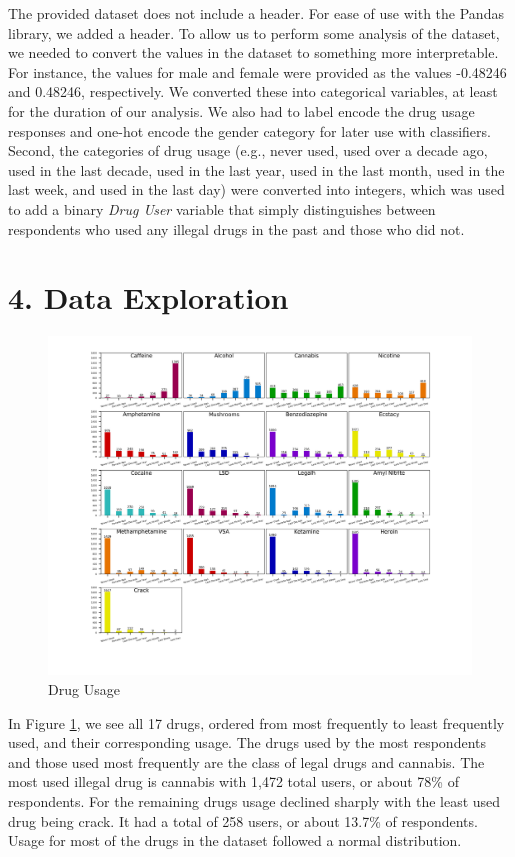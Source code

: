 \documentclass[10pt]{article}
\begin{document}
The provided dataset does not include a header. For ease of use with the Pandas library, we added a header. To allow us to perform some analysis of the dataset, we needed to convert the values in the dataset to something more interpretable. For instance, the values for male and female were provided as the values -0.48246 and 0.48246, respectively. We converted these into categorical variables, at least for the duration of our analysis. We also had to label encode the drug usage responses and one-hot encode the gender category for later use with classifiers. Second, the categories of drug usage (e.g., never used, used over a decade ago, used in the last decade, used in the last year, used in the last month, used in the last week, and used in the last day) were converted into integers, which was used to add a binary \textit{Drug User} variable that simply distinguishes between respondents who used any illegal drugs in the past and those who did not.

\section*{4. Data Exploration}

\begin{figure}[H]
\caption{Drug Usage}
\label{fig:drugs}
\centering
\includegraphics[scale=0.6]{drugs.png}
\end{figure}

In Figure \ref{fig:drugs}, we see all 17 drugs, ordered from most frequently to least frequently used, and their corresponding usage. The drugs used by the most respondents and those used most frequently are the class of legal drugs and cannabis. The most used illegal drug is cannabis with 1,472 total users, or about 78\% of respondents. For the remaining drugs usage declined sharply with the least used drug being crack. It had a total of 258 users, or about 13.7\% of respondents. Usage for most of the drugs in the dataset followed a normal distribution.
\end{document}
